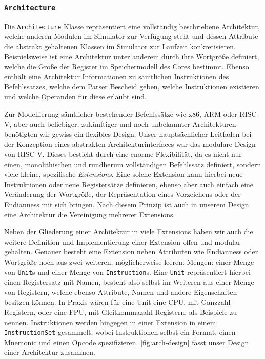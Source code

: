 
\subsubsection{\texttt{Architecture}}

Die \texttt{Architecture} Klasse repräsentiert eine vollständig beschriebene
Architektur, welche anderen Modulen im Simulator zur Verfügung steht und dessen
Attribute die abstrakt gehaltenen Klassen im Simulator zur Laufzeit
konkretisieren. Beispielsweise ist eine Architektur unter anderem durch ihre
Wortgröße definiert, welche die Größe der Register im Speichermodell des Cores
bestimmt. Ebenso enthält eine Architektur Informationen zu sämtlichen
Instruktionen des Befehlssatzes, welche dem Parser Bescheid geben, welche
Instruktionen existieren und welche Operanden für diese erlaubt sind.

Zur Modellierung sämtlicher bestehender Befehlssätze wie x86, ARM oder RISC-V,
aber auch beliebiger, zukünftiger und noch unbekannter Architekturen benötigten
wir gewiss ein flexibles Design. Unser hauptsächlicher Leitfaden bei der
Konzeption eines abstrakten Architekturinterfaces war das modulare Design von
RISC-V. Dieses besticht durch eine enorme Flexibilität, da es nicht nur einen,
monolithischen und rundherum vollständigen Befehlssatz definiert, sondern viele
kleine, spezifische \emph{Extensions}. Eine solche Extension kann hierbei neue
Instruktionen oder neue Registersätze definieren, ebenso aber auch einfach eine
Veränderung der Wortgröße, der Repräsentation eines Vorzeichens oder der
Endianness mit sich bringen. Nach diesem Prinzip ist auch in unserem Design eine
Architektur die Vereinigung mehrerer Extensions.

Neben der Gliederung einer Architektur in viele Extensions haben wir auch die
weitere Definition und Implementierung einer Extension offen und modular
gehalten. Genauer besteht eine Extension neben Attributen wie Endianness oder
Wortgröße noch aus zwei weiteren, möglicherweise leeren, Mengen: einer Menge von
\texttt{Unit}s und einer Menge von \texttt{Instruction}s. Eine \texttt{Unit}
repräsentiert hierbei einen Registersatz mit Namen, besteht also selbst im
Weiteren aus einer Menge von Registern, welche ebenso Attribute, Namen und
andere Eigenschaften besitzen können. In Praxis wären für eine Unit eine CPU,
mit Ganzzahl-Registern, oder eine FPU, mit Gleitkommazahl-Registern, als
Beispiele zu nennen. Instruktionen werden hingegen in einer Extension in einem
\texttt{InstructionSet} gesammelt, wobei Instruktionen selbst ein Format, einen
Mnemonic und einen Opcode spezifizieren. \autoref{fig:arch-design} fasst unser
Design einer Architektur zusammen.

